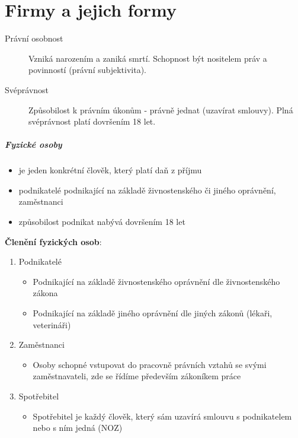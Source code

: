 \chapter{Firmy a jejich formy}

\begin{description}
    \item[Právní osobnost] Vzniká narozením a zaniká smrtí. Schopnost být nositelem práv a povinností (právní subjektivita).
    \item[Svéprávnost] Způsobilost k právním úkonům - právně jednat (uzavírat smlouvy). Plná svéprávnost platí dovršením 18 let.
\end{description}

\paragraph{Fyzické osoby}

\begin{itemize}
    \item je jeden konkrétní člověk, který platí daň z příjmu
    \item podnikatelé podnikající na základě živnostenského či jiného oprávnění, zaměstnanci
    \item způsobilost podnikat nabývá dovršením 18 let
\end{itemize}

\textbf{Členění fyzických osob}:
\begin{enumerate}
    \item Podnikatelé
    \begin{itemize}
        \item Podnikající na základě živnostenského oprávnění dle živnostenského zákona
        \item Podnikající na základě jiného oprávnění dle jiných zákonů (lékaři, veterináři)
    \end{itemize}
    \item Zaměstnanci
    \begin{itemize}
        \item Osoby schopné vstupovat do pracovně právních vztahů se svými zaměstnavateli, zde se řídíme především zákoníkem práce
    \end{itemize}
    \item Spotřebitel
    \begin{itemize}
        \item Spotřebitel je každý člověk, který sám uzavírá smlouvu s podnikatelem nebo s ním jedná (NOZ)
    \end{itemize}
\end{enumerate}

